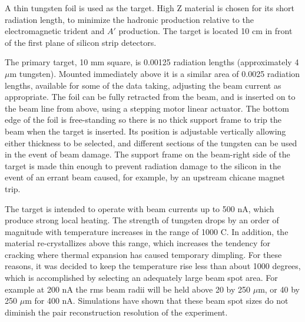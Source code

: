 A thin tungsten foil is used as the target. High Z material is
chosen for its short radiation length, to minimize the hadronic
production relative to the electromagnetic trident and $A'$
production. The target is located 10 cm in front of the first
plane of silicon strip detectors.

The primary target, 10 mm square, is 0.00125 radiation lengths
(approximately 4 $\mu$m tungsten). Mounted immediately above it
is a similar area of 0.0025 radiation lengths, available for some
of the data taking, adjusting the beam current as appropriate.
The foil can be fully retracted from the beam, and is inserted on
to the beam line from above, using a stepping motor linear
actuator. The bottom edge of the foil is free-standing so there
is no thick support frame to trip the beam when the target is
inserted. Its position is adjustable vertically allowing either
thickness to be selected, and different sections of the
tungsten can be used in the event of beam damage. The support
frame on the beam-right side of the target is made thin enough to
prevent radiation damage to the silicon in the event of an errant
beam caused, for example, by an upstream chicane magnet trip.
               
The target is intended to operate with beam currents up to 500
nA, which produce strong local heating. The strength of tungsten
drops by an order of magnitude with temperature increases in the
range of 1000 C. In addition, the material re-crystallizes above
this range, which increases the tendency for cracking where
thermal expansion has caused temporary dimpling. For these
reasons, it was decided to keep the temperature rise less than
about 1000 degrees, which is accomplished by selecting an
adequately large beam spot area. For example at 200 nA the rms
beam radii will be held above 20 by 250 $\mu$m, or 40 by 250
$\mu$m for 400 nA. Simulations have shown that these beam spot
sizes do not diminish the pair reconstruction resolution of the
experiment.


 
